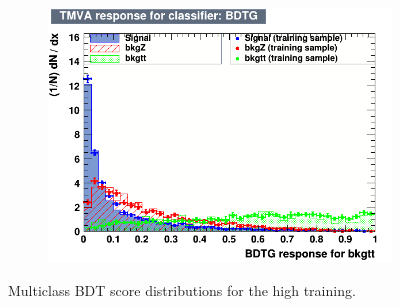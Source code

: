 \begin{figure}[!htbp]
\begin{subfigure}[b]{0.495\textwidth}
    \label{fig:overtrain_bkgZ_highpt}
  \end{subfigure}%
  \hfill
  \begin{subfigure}[b]{0.495\textwidth}
    \centering
    \includegraphics[width=\linewidth]{images/plots_overtrain_gt200/overtrain_bkgtt_BDTG.png}

    \label{fig:overtrain_bkgtt_highpt}
  \end{subfigure}
  
  \caption{Multiclass BDT score distributions for the high \pth training.}
  \label{highpt_scores}
\end{figure}

